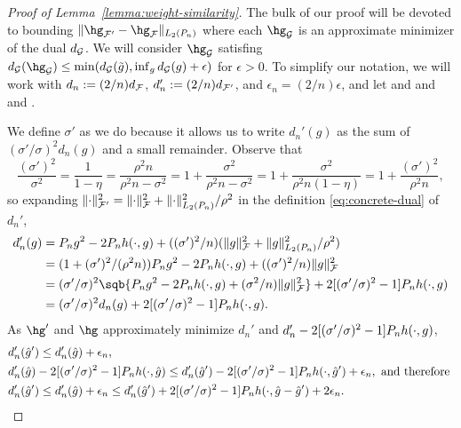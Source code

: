\begin{proof}[Proof of Lemma~\ref{lemma:weight-similarity}]

The bulk of our proof will be devoted to bounding $\norm{\hg_{\F'}- \hg_{\F}}_{L_2(\Pn)}$ where
each $\hg_{\GG}$ is an approximate minimizer of the dual $d_{\mathcal{G}}$.
We will consider $\hg_{\GG}$ satisfing $d_{\GG}(\hg_{\GG}) \le \min(d_{\GG}(\tilde g), \inf_g d_{\GG}(g) + \epsilon)$
for $\epsilon > 0$.  To simplify our notation, we will work with $d_n := (2/n)d_{\mathcal{F}}$, $d_n' := (2/n)d_{\mathcal{F}'}$, and $\epsilon_n = (2/n)\epsilon$,
and let \smash{$\hg = \hg_{\F}$} and  and \smash{$\sigma = \sigma_{\F}$} and .

We define $\sigma'$ as we do because it allows us to write $d_n'(g)$ as the sum of $(\sigma'/\sigma)^2 d_n(g)$ and a small remainder.
Observe that  
\[ 
\frac{(\sigma')^2}{\sigma^2} =  \frac{1}{1-\eta} = \frac{\rho^2 n}{\rho^2 n - \sigma^2} = 1 + \frac{\sigma^2}{\rho^2 n - \sigma^2} =  1+\frac{\sigma^2}{\rho^2 n(1-\eta)} = 1+\frac{(\sigma')^2}{\rho^2 n}, \] 
so expanding $\norm{\cdot}_{\F'}^2 = \norm{\cdot}_{\F}^2 + \norm{\cdot}_{L_2(\Pn)}^2/\rho^2$ in the definition \eqref{eq:concrete-dual} of $d_n'$, 
\begin{equation*}
\begin{aligned} 
d_n'(g) 
&= \Pn g^2 - 2\Pn h(\cdot, g)  + ((\sigma')^2/n)(\norm{g}_{\F}^2 + \norm{g}_{L_2(\Pn)}^2/\rho^2) \\
&= (1+(\sigma')^2/(\rho^2 n)) \Pn g^2 - 2\Pn h(\cdot, g)  + ((\sigma')^2/n)\norm{g}_{\F}^2 \\
&= (\sigma'/\sigma)^2 \sqb{\Pn g^2 - 2\Pn h(\cdot, g) +  (\sigma^2/n)\norm{g}_{\F}^2} + 2[(\sigma'/\sigma)^2 - 1]\Pn h(\cdot, g) \\
&= (\sigma'/\sigma)^2 d_n(g) + 2[(\sigma'/\sigma)^2 - 1]\Pn h(\cdot, g).
\end{aligned} 
\end{equation*}
As $\hg'$ and $\hg$ approximately minimize $d_n'$ and $d_n' - 2[(\sigma'/\sigma)^2 - 1]\Pn h(\cdot, g)$,
\begin{align*}
&d_n'(\hat g')  \le d_n'(\hat g) + \epsilon_n, \\
&d_n'(\hat g) - 2[(\sigma'/\sigma)^2 - 1]\Pn h(\cdot, \hat g) \le d_n'(\hat g') - 2[(\sigma'/\sigma)^2 - 1]\Pn h(\cdot, \hat g') + \epsilon_n, \text{ and therefore } \\ 
&d_n'(\hat g')  \le d_n'(\hat g) + \epsilon_n \le d_n'(\hat g') + 2[(\sigma'/\sigma)^2 - 1]\Pn h(\cdot, \hat g - \hat g') + 2\epsilon_n. 

\end{align*}
\end{proof}
